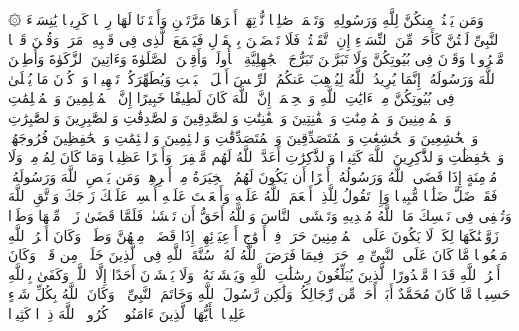 \stopbuffer%
\startbuffer[\q:33:31]
۞ وَمَن یَقۡنُتۡ مِنكُنَّ لِلَّهِ وَرَسُولِهِۦ وَتَعۡمَلۡ صَٰلِحࣰا نُّؤۡتِهَاۤ أَجۡرَهَا مَرَّتَیۡنِ وَأَعۡتَدۡنَا لَهَا رِزۡقࣰا كَرِیمࣰا%
\stopbuffer%
\startbuffer[\q:33:32]
یَٰنِسَاۤءَ ٱلنَّبِیِّ لَسۡتُنَّ كَأَحَدࣲ مِّنَ ٱلنِّسَاۤءِ إِنِ ٱتَّقَیۡتُنَّۚ فَلَا تَخۡضَعۡنَ بِٱلۡقَوۡلِ فَیَطۡمَعَ ٱلَّذِی فِی قَلۡبِهِۦ مَرَضࣱ وَقُلۡنَ قَوۡلࣰا مَّعۡرُوفࣰا%
\stopbuffer%
\startbuffer[\q:33:33]
وَقَرۡنَ فِی بُیُوتِكُنَّ وَلَا تَبَرَّجۡنَ تَبَرُّجَ ٱلۡجَٰهِلِیَّةِ ٱلۡأُولَىٰۖ وَأَقِمۡنَ ٱلصَّلَوٰةَ وَءَاتِینَ ٱلزَّكَوٰةَ وَأَطِعۡنَ ٱللَّهَ وَرَسُولَهُۥۤۚ إِنَّمَا یُرِیدُ ٱللَّهُ لِیُذۡهِبَ عَنكُمُ ٱلرِّجۡسَ أَهۡلَ ٱلۡبَیۡتِ وَیُطَهِّرَكُمۡ تَطۡهِیرࣰا%
\stopbuffer%
\startbuffer[\q:33:34]
وَٱذۡكُرۡنَ مَا یُتۡلَىٰ فِی بُیُوتِكُنَّ مِنۡ ءَایَٰتِ ٱللَّهِ وَٱلۡحِكۡمَةِۚ إِنَّ ٱللَّهَ كَانَ لَطِیفًا خَبِیرًا%
\stopbuffer%
\startbuffer[\q:33:35]
إِنَّ ٱلۡمُسۡلِمِینَ وَٱلۡمُسۡلِمَٰتِ وَٱلۡمُؤۡمِنِینَ وَٱلۡمُؤۡمِنَٰتِ وَٱلۡقَٰنِتِینَ وَٱلۡقَٰنِتَٰتِ وَٱلصَّٰدِقِینَ وَٱلصَّٰدِقَٰتِ وَٱلصَّٰبِرِینَ وَٱلصَّٰبِرَٰتِ وَٱلۡخَٰشِعِینَ وَٱلۡخَٰشِعَٰتِ وَٱلۡمُتَصَدِّقِینَ وَٱلۡمُتَصَدِّقَٰتِ وَٱلصَّٰۤئِمِینَ وَٱلصَّٰۤئِمَٰتِ وَٱلۡحَٰفِظِینَ فُرُوجَهُمۡ وَٱلۡحَٰفِظَٰتِ وَٱلذَّٰكِرِینَ ٱللَّهَ كَثِیرࣰا وَٱلذَّٰكِرَٰتِ أَعَدَّ ٱللَّهُ لَهُم مَّغۡفِرَةࣰ وَأَجۡرًا عَظِیمࣰا%
\stopbuffer%
\startbuffer[\q:33:36]
وَمَا كَانَ لِمُؤۡمِنࣲ وَلَا مُؤۡمِنَةٍ إِذَا قَضَى ٱللَّهُ وَرَسُولُهُۥۤ أَمۡرًا أَن یَكُونَ لَهُمُ ٱلۡخِیَرَةُ مِنۡ أَمۡرِهِمۡۗ وَمَن یَعۡصِ ٱللَّهَ وَرَسُولَهُۥ فَقَدۡ ضَلَّ ضَلَٰلࣰا مُّبِینࣰا%
\stopbuffer%
\startbuffer[\q:33:37]
وَإِذۡ تَقُولُ لِلَّذِیۤ أَنۡعَمَ ٱللَّهُ عَلَیۡهِ وَأَنۡعَمۡتَ عَلَیۡهِ أَمۡسِكۡ عَلَیۡكَ زَوۡجَكَ وَٱتَّقِ ٱللَّهَ وَتُخۡفِی فِی نَفۡسِكَ مَا ٱللَّهُ مُبۡدِیهِ وَتَخۡشَى ٱلنَّاسَ وَٱللَّهُ أَحَقُّ أَن تَخۡشَىٰهُۖ فَلَمَّا قَضَىٰ زَیۡدࣱ مِّنۡهَا وَطَرࣰا زَوَّجۡنَٰكَهَا لِكَیۡ لَا یَكُونَ عَلَى ٱلۡمُؤۡمِنِینَ حَرَجࣱ فِیۤ أَزۡوَٰجِ أَدۡعِیَاۤئِهِمۡ إِذَا قَضَوۡا۟ مِنۡهُنَّ وَطَرࣰاۚ وَكَانَ أَمۡرُ ٱللَّهِ مَفۡعُولࣰا%
\stopbuffer%
\startbuffer[\q:33:38]
مَّا كَانَ عَلَى ٱلنَّبِیِّ مِنۡ حَرَجࣲ فِیمَا فَرَضَ ٱللَّهُ لَهُۥۖ سُنَّةَ ٱللَّهِ فِی ٱلَّذِینَ خَلَوۡا۟ مِن قَبۡلُۚ وَكَانَ أَمۡرُ ٱللَّهِ قَدَرࣰا مَّقۡدُورًا%
\stopbuffer%
\startbuffer[\q:33:39]
ٱلَّذِینَ یُبَلِّغُونَ رِسَٰلَٰتِ ٱللَّهِ وَیَخۡشَوۡنَهُۥ وَلَا یَخۡشَوۡنَ أَحَدًا إِلَّا ٱللَّهَۗ وَكَفَىٰ بِٱللَّهِ حَسِیبࣰا%
\stopbuffer%
\startbuffer[\q:33:40]
مَّا كَانَ مُحَمَّدٌ أَبَاۤ أَحَدࣲ مِّن رِّجَالِكُمۡ وَلَٰكِن رَّسُولَ ٱللَّهِ وَخَاتَمَ ٱلنَّبِیِّۦنَۗ وَكَانَ ٱللَّهُ بِكُلِّ شَیۡءٍ عَلِیمࣰا%
\stopbuffer%
\startbuffer[\q:33:41]
یَٰۤأَیُّهَا ٱلَّذِینَ ءَامَنُوا۟ ٱذۡكُرُوا۟ ٱللَّهَ ذِكۡرࣰا كَثِیرࣰا%
